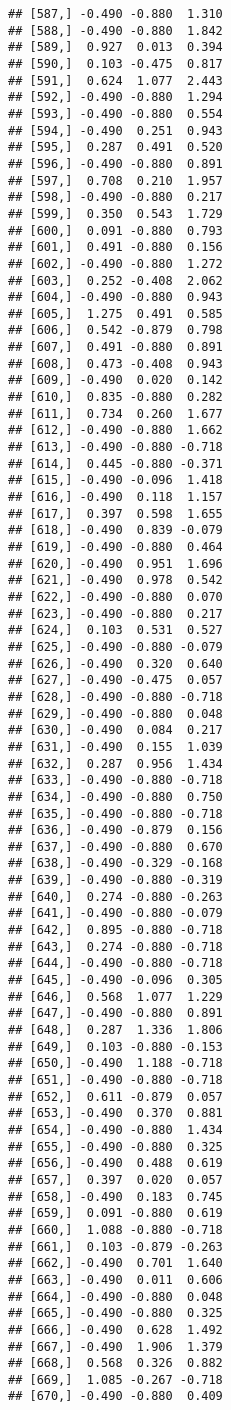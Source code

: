 \documentclass[
]{article}
\begin{document}
\begin{verbatim}
## [587,] -0.490 -0.880  1.310
## [588,] -0.490 -0.880  1.842
## [589,]  0.927  0.013  0.394
## [590,]  0.103 -0.475  0.817
## [591,]  0.624  1.077  2.443
## [592,] -0.490 -0.880  1.294
## [593,] -0.490 -0.880  0.554
## [594,] -0.490  0.251  0.943
## [595,]  0.287  0.491  0.520
## [596,] -0.490 -0.880  0.891
## [597,]  0.708  0.210  1.957
## [598,] -0.490 -0.880  0.217
## [599,]  0.350  0.543  1.729
## [600,]  0.091 -0.880  0.793
## [601,]  0.491 -0.880  0.156
## [602,] -0.490 -0.880  1.272
## [603,]  0.252 -0.408  2.062
## [604,] -0.490 -0.880  0.943
## [605,]  1.275  0.491  0.585
## [606,]  0.542 -0.879  0.798
## [607,]  0.491 -0.880  0.891
## [608,]  0.473 -0.408  0.943
## [609,] -0.490  0.020  0.142
## [610,]  0.835 -0.880  0.282
## [611,]  0.734  0.260  1.677
## [612,] -0.490 -0.880  1.662
## [613,] -0.490 -0.880 -0.718
## [614,]  0.445 -0.880 -0.371
## [615,] -0.490 -0.096  1.418
## [616,] -0.490  0.118  1.157
## [617,]  0.397  0.598  1.655
## [618,] -0.490  0.839 -0.079
## [619,] -0.490 -0.880  0.464
## [620,] -0.490  0.951  1.696
## [621,] -0.490  0.978  0.542
## [622,] -0.490 -0.880  0.070
## [623,] -0.490 -0.880  0.217
## [624,]  0.103  0.531  0.527
## [625,] -0.490 -0.880 -0.079
## [626,] -0.490  0.320  0.640
## [627,] -0.490 -0.475  0.057
## [628,] -0.490 -0.880 -0.718
## [629,] -0.490 -0.880  0.048
## [630,] -0.490  0.084  0.217
## [631,] -0.490  0.155  1.039
## [632,]  0.287  0.956  1.434
## [633,] -0.490 -0.880 -0.718
## [634,] -0.490 -0.880  0.750
## [635,] -0.490 -0.880 -0.718
## [636,] -0.490 -0.879  0.156
## [637,] -0.490 -0.880  0.670
## [638,] -0.490 -0.329 -0.168
## [639,] -0.490 -0.880 -0.319
## [640,]  0.274 -0.880 -0.263
## [641,] -0.490 -0.880 -0.079
## [642,]  0.895 -0.880 -0.718
## [643,]  0.274 -0.880 -0.718
## [644,] -0.490 -0.880 -0.718
## [645,] -0.490 -0.096  0.305
## [646,]  0.568  1.077  1.229
## [647,] -0.490 -0.880  0.891
## [648,]  0.287  1.336  1.806
## [649,]  0.103 -0.880 -0.153
## [650,] -0.490  1.188 -0.718
## [651,] -0.490 -0.880 -0.718
## [652,]  0.611 -0.879  0.057
## [653,] -0.490  0.370  0.881
## [654,] -0.490 -0.880  1.434
## [655,] -0.490 -0.880  0.325
## [656,] -0.490  0.488  0.619
## [657,]  0.397  0.020  0.057
## [658,] -0.490  0.183  0.745
## [659,]  0.091 -0.880  0.619
## [660,]  1.088 -0.880 -0.718
## [661,]  0.103 -0.879 -0.263
## [662,] -0.490  0.701  1.640
## [663,] -0.490  0.011  0.606
## [664,] -0.490 -0.880  0.048
## [665,] -0.490 -0.880  0.325
## [666,] -0.490  0.628  1.492
## [667,] -0.490  1.906  1.379
## [668,]  0.568  0.326  0.882
## [669,]  1.085 -0.267 -0.718
## [670,] -0.490 -0.880  0.409

\end{verbatim}
\end{document}
